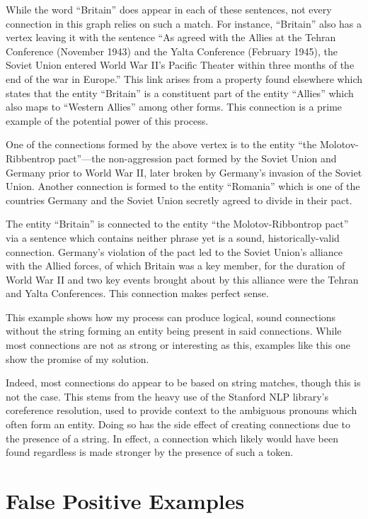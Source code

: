 While the word ``Britain'' does appear in each of these sentences, not every connection in this graph relies on such a match.  For instance, ``Britain'' also has a vertex leaving it with the sentence ``As agreed with the Allies at the Tehran Conference (November 1943) and the Yalta Conference (February 1945), the Soviet Union entered World War II's Pacific Theater within three months of the end of the war in Europe.''  This link arises from a property found elsewhere which states that the entity ``Britain'' is a constituent part of the entity ``Allies'' which also maps to ``Western Allies'' among other forms.  This connection is a prime example of the potential power of this process.

One of the connections formed by the above vertex is to the entity ``the Molotov-Ribbentrop pact''---the non-aggression pact formed by the Soviet Union and Germany prior to World War II, later broken by Germany's invasion of the Soviet Union.  Another connection is formed to the entity ``Romania'' which is one of the countries Germany and the Soviet Union secretly agreed to divide in their pact.

The entity ``Britain'' is connected to the entity ``the Molotov-Ribbontrop pact'' via a sentence which contains neither phrase yet is a sound, historically-valid connection.  Germany's violation of the pact led to the Soviet Union's alliance with the Allied forces, of which Britain was a key member, for the duration of World War II and two key events brought about by this alliance were the Tehran and Yalta Conferences.  This connection makes perfect sense.

This example shows how my process can produce logical, sound connections without the string forming an entity being present in said connections.  While most connections are not as strong or interesting as this, examples like this one show the promise of my solution.

Indeed, most connections do appear to be based on string matches, though this is not the case.  This stems from the heavy use of the Stanford NLP library's coreference resolution, used to provide context to the ambiguous pronouns which often form an entity.  Doing so has the side effect of creating connections due to the presence of a string.  In effect, a connection which likely would have been found regardless is made stronger by the presence of such a token.

\section{False Positive Examples}

